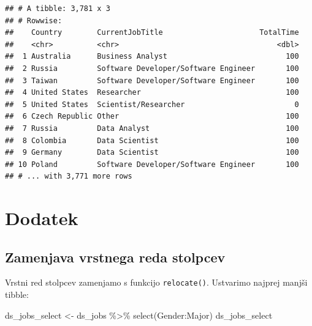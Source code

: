 \documentclass[
]{book}
\newenvironment{Shaded}{\begin{snugshade}}{\end{snugshade}}
\newcommand{\FunctionTok}[1]{\textcolor[rgb]{0.00,0.00,0.00}{#1}}
\newcommand{\NormalTok}[1]{#1}
\newcommand{\OtherTok}[1]{\textcolor[rgb]{0.56,0.35,0.01}{#1}}
\newcommand{\SpecialCharTok}[1]{\textcolor[rgb]{0.00,0.00,0.00}{#1}}
\begin{document}
\begin{verbatim}
## # A tibble: 3,781 x 3
## # Rowwise: 
##    Country        CurrentJobTitle                      TotalTime
##    <chr>          <chr>                                    <dbl>
##  1 Australia      Business Analyst                           100
##  2 Russia         Software Developer/Software Engineer       100
##  3 Taiwan         Software Developer/Software Engineer       100
##  4 United States  Researcher                                 100
##  5 United States  Scientist/Researcher                         0
##  6 Czech Republic Other                                      100
##  7 Russia         Data Analyst                               100
##  8 Colombia       Data Scientist                             100
##  9 Germany        Data Scientist                             100
## 10 Poland         Software Developer/Software Engineer       100
## # ... with 3,771 more rows
\end{verbatim}

\hypertarget{dodatek}{%
\section{Dodatek}\label{dodatek}}

\hypertarget{zamenjava-vrstnega-reda-stolpcev}{%
\subsection{Zamenjava vrstnega reda stolpcev}\label{zamenjava-vrstnega-reda-stolpcev}}

Vrstni red stolpcev zamenjamo s funkcijo \texttt{relocate()}. Ustvarimo najprej manjši tibble:

\begin{Shaded}
\begin{Highlighting}[]
\NormalTok{ds\_jobs\_select }\OtherTok{\textless{}{-}}\NormalTok{ ds\_jobs }\SpecialCharTok{\%\textgreater{}\%}
  \FunctionTok{select}\NormalTok{(Gender}\SpecialCharTok{:}\NormalTok{Major)}
\NormalTok{ds\_jobs\_select}
\end{Highlighting}
\end{Shaded}
\end{document}
